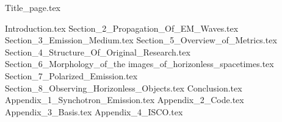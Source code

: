 \documentclass[12pt]{article}
\numberwithin{equation}{section}
\numberwithin{figure}{section}
\begin{document}
{Title_page.tex}
\newpage
\tableofcontents
\listoffigures
\listoftables
\newpage

\nocite{EHT_M87_I,
		EHT_M87_II,
		EHT_M87_III,
		EHT_M87_IV,
		EHT_M87_V,
		EHT_M87_VI,
		EHT_M87_VII,
		EHT_M87_VIII,
		EHT_M87_IX,
		EHT_SGR_I,
		EHT_SGR_II,
		EHT_SGR_III,
		EHT_SGR_IV,
		EHT_SGR_V,
		EHT_SGR_VI,
		EHT_SGR_VII,
		EHT_SGR_VIII}

{Introduction.tex}
\newpage
{Section_2_Propagation_Of_EM_Waves.tex}
\newpage
{Section_3_Emission_Medium.tex}
\newpage
{Section_5_Overview_of_Metrics.tex}
\newpage
{Section_4_Structure_Of_Original_Research.tex}
\newpage
{Section_6_Morphology_of_the images_of_horizonless_spacetimes.tex}
\newpage
{Section_7_Polarized_Emission.tex}
\newpage
{Section_8_Observing_Horizonless_Objects.tex}
\newpage
{Conclusion.tex}
\newpage
{Appendix_1_Synchotron_Emission.tex}
\newpage
{Appendix_2_Code.tex}
\newpage
{Appendix_3_Basis.tex}
\newpage
{Appendix_4_ISCO.tex}
\newpage



\end{document}
